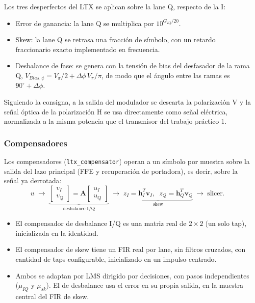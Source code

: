 Los tres desperfectos del LTX se aplican sobre la lane Q, respecto de la
I:

\begin{itemize}\itemsep2pt
\item Error de ganancia: la lane Q se multiplica por $10^{G_{IQ}/20}$.
\item Skew: la lane Q se retrasa una fracción de símbolo, con un retardo
      fraccionario exacto implementado en frecuencia.
\item Desbalance de fase: se genera con la tensión de bias del
      desfasador de la rama Q, $V_{Bias,\phi} = V_\pi/2 + \Delta\phi\,
      V_\pi/\pi$, de modo que el ángulo entre las ramas es
      $90^\circ + \Delta\phi$.
\end{itemize}

Siguiendo la consigna, a la salida del modulador se descarta la
polarización V y la señal óptica de la polarización H se usa directamente
como señal eléctrica, normalizada a la misma potencia que el transmisor
del trabajo práctico 1.

\subsubsection*{Compensadores}

Los compensadores (\texttt{ltx\_compensator}) operan a un símbolo por
muestra sobre la salida del lazo principal (FFE y recuperación de
portadora), es decir, sobre la señal ya derrotada:
%
\begin{equation}
u \;\rightarrow\; \underbrace{\begin{bmatrix} v_I \\ v_Q \end{bmatrix}
= \mathbf{A}\begin{bmatrix} u_I \\ u_Q \end{bmatrix}}_{\text{desbalance I/Q}}
\;\rightarrow\;
\underbrace{z_I = \mathbf{h}_I^T \mathbf{v}_I,\;\;
z_Q = \mathbf{h}_Q^T \mathbf{v}_Q}_{\text{skew}}
\;\rightarrow\; \text{slicer}.
\end{equation}

\begin{itemize}\itemsep2pt
\item El compensador de desbalance I/Q es una matriz real de $2\times2$
      (un solo tap), inicializada en la identidad.
\item El compensador de skew tiene un FIR real por lane, sin filtros
      cruzados, con cantidad de taps configurable, inicializado en un
      impulso centrado.
\item Ambos se adaptan por LMS dirigido por decisiones, con pasos
      independientes ($\mu_{IQ}$ y $\mu_{sk}$). El de desbalance usa el
      error en su propia salida, en la muestra central del FIR de skew.
\end{itemize}

